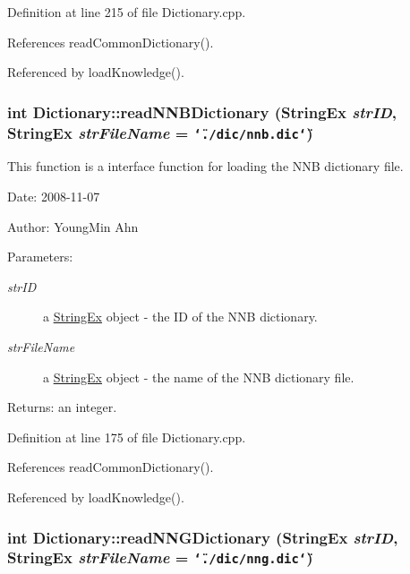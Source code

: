 Definition at line 215 of file Dictionary.cpp.

References readCommonDictionary().

Referenced by loadKnowledge().\hypertarget{classkmaOrange_1_1Dictionary_a94306b03154efe9b28bbbd84284ecd5}{
\subsubsection[{readNNBDictionary}]{\setlength{\rightskip}{0pt plus 5cm}int Dictionary::readNNBDictionary ({\bf StringEx} {\em strID}, \/  {\bf StringEx} {\em strFileName} = {\tt \char`\"{}./dic/nnb.dic\char`\"{}})}}
\label{classkmaOrange_1_1Dictionary_a94306b03154efe9b28bbbd84284ecd5}


This function is a interface function for loading the NNB dictionary file. 

\begin{Desc}
\item[Date:]2008-11-07 \end{Desc}
\begin{Desc}
\item[Author:]YoungMin Ahn \end{Desc}
\begin{Desc}
\item[Parameters:]
\begin{description}
\item[{\em strID}]a \hyperlink{classStringEx}{StringEx} object - the ID of the NNB dictionary. \item[{\em strFileName}]a \hyperlink{classStringEx}{StringEx} object - the name of the NNB dictionary file. \end{description}
\end{Desc}
\begin{Desc}
\item[Returns:]an integer. \end{Desc}


Definition at line 175 of file Dictionary.cpp.

References readCommonDictionary().

Referenced by loadKnowledge().\hypertarget{classkmaOrange_1_1Dictionary_885af9add2e57735325161b0cbe50fd0}{
\subsubsection[{readNNGDictionary}]{\setlength{\rightskip}{0pt plus 5cm}int Dictionary::readNNGDictionary ({\bf StringEx} {\em strID}, \/  {\bf StringEx} {\em strFileName} = {\tt \char`\"{}./dic/nng.dic\char`\"{}})}}
\label{classkmaOrange_1_1Dictionary_885af9add2e57735325161b0cbe50fd0}


